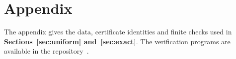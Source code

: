 \FloatBarrier
\section*{Appendix}
The appendix gives the data, certificate identities and finite checks used
in \textbf{Sections~\ref{sec:uniform} and~\ref{sec:exact}}. The verification
programs are available in the repository~\cite{FGSTCode}.
\setcounter{subsection}{0}
\setcounter{secnumdepth}{4}
\renewcommand{\thesubsection}{\Alph{subsection}}
\renewcommand{\theHsubsection}{appendix.\arabic{subsection}}
\renewcommand{\theequation}{\thesubsection.\arabic{equation}}
\renewcommand{\thetheorem}{\thesubsection.\arabic{theorem}}
\renewcommand{\thefigure}{\thesubsection.\arabic{figure}}
\renewcommand{\thetable}{\thesubsection.\arabic{table}}
\renewcommand{\theHfigure}{supp.\thesubsection.\arabic{figure}}
\renewcommand{\theHtable}{supp.\thesubsection.\arabic{table}}
\renewcommand{\theHequation}{supp.\thesubsection.\arabic{equation}}
\renewcommand{\theHtheorem}{supp.\thesubsection.\arabic{theorem}}







